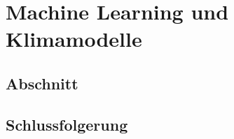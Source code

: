 %
%
%
\chapter{Machine Learning und Klimamodelle\label{chapter:learning}}
\begin{refsection}

\section{Abschnitt}

\section{Schlussfolgerung}

\printbibliography[heading=subbibliography]
\end{refsection}
